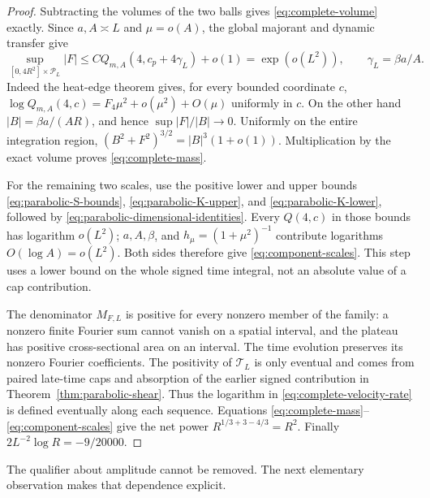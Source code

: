 \begin{proof}
Subtracting the volumes of the two balls gives
\eqref{eq:complete-volume} exactly.  Since $a,A\asymp L$ and
$\mu=o(A)$, the global majorant and dynamic transfer give
\[
 \sup_{[0,4R^2]\times\mathcal P_L}|F|
 \le C Q_{m,A}(4,c_p+4\gamma_L)+o(1)
 =\exp(o(L^2)),
 \qquad \gamma_L=\beta a/A.
\]
Indeed the heat-edge theorem gives, for every bounded coordinate $c$,
$\log Q_{m,A}(4,c)=F_4\mu^2+o(\mu^2)+O(\mu)$ uniformly in $c$.
On the other hand $|B|=\beta a/(AR)$, and hence
$\sup|F|/|B|\to0$.  Uniformly on the entire integration region,
$(B^2+F^2)^{3/2}=|B|^3(1+o(1))$.
Multiplication by the exact volume proves
\eqref{eq:complete-mass}.

For the remaining two scales, use the positive lower and upper bounds
\eqref{eq:parabolic-S-bounds}, \eqref{eq:parabolic-K-upper}, and
\eqref{eq:parabolic-K-lower}, followed by
\eqref{eq:parabolic-dimensional-identities}.
Every $Q(4,c)$ in those bounds has logarithm $o(L^2)$;
$a,A,\beta$, and $h_\mu=(1+\mu^2)^{-1}$ contribute logarithms
$O(\log A)=o(L^2)$.  Both sides therefore give
\eqref{eq:component-scales}.  This step uses a lower bound on the
whole signed time integral, not an absolute value of a cap contribution.

The denominator $M_{F,L}$ is positive for every nonzero member of the
family: a nonzero finite Fourier sum cannot vanish on a spatial
interval, and the plateau has positive cross-sectional area on an
interval.  The time evolution preserves its nonzero Fourier
coefficients.  The positivity of $\mathcal T_L$ is only eventual and
comes from paired late-time caps and absorption of the earlier signed
contribution in Theorem~\ref{thm:parabolic-shear}.
Thus the logarithm in \eqref{eq:complete-velocity-rate} is defined
eventually along each sequence.  Equations
\eqref{eq:complete-mass}--\eqref{eq:component-scales} give the net
power $R^{1/3+3-4/3}=R^2$.  Finally
$2L^{-2}\log R=-9/20000$.
\end{proof}

The qualifier about amplitude cannot be removed.  The next elementary
observation makes that dependence explicit.

